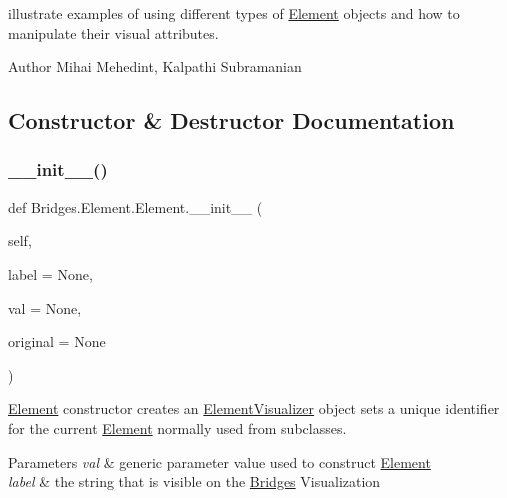 illustrate examples of using different types of \mbox{\hyperlink{class_bridges_1_1_element_1_1_element}{Element}} objects and how to manipulate their visual attributes.

\begin{DoxyAuthor}{Author}
Mihai Mehedint, Kalpathi Subramanian 
\end{DoxyAuthor}


\subsection{Constructor \& Destructor Documentation}
\mbox{\label{class_bridges_1_1_element_1_1_element_a3cf9af1f49a0e03f8e596c637836a7fe}} 
\subsubsection{\texorpdfstring{\+\_\+\+\_\+init\+\_\+\+\_\+()}{\_\_init\_\_()}}
{\footnotesize\ttfamily def Bridges.\+Element.\+Element.\+\_\+\+\_\+init\+\_\+\+\_\+ (\begin{DoxyParamCaption}\item[{}]{self,  }\item[{}]{label = {\ttfamily None},  }\item[{}]{val = {\ttfamily None},  }\item[{}]{original = {\ttfamily None} }\end{DoxyParamCaption})}



\mbox{\hyperlink{class_bridges_1_1_element_1_1_element}{Element}} constructor creates an \mbox{\hyperlink{namespace_bridges_1_1_element_visualizer}{Element\+Visualizer}} object sets a unique identifier for the current \mbox{\hyperlink{class_bridges_1_1_element_1_1_element}{Element}} normally used from subclasses. 


\begin{DoxyParams}{Parameters}
{\em val} & generic parameter value used to construct \mbox{\hyperlink{class_bridges_1_1_element_1_1_element}{Element}} \\
\hline
{\em label} & the string that is visible on the \mbox{\hyperlink{namespace_bridges_1_1_bridges}{Bridges}} Visualization \\
\hline
\end{DoxyParams}


